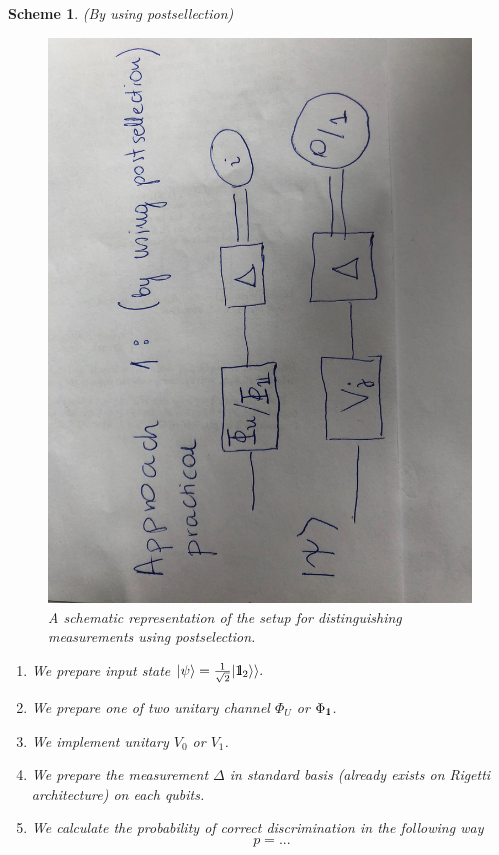 \documentclass[11pt,a4paper,reqno, oneside]{amsart}
\newcommand{\ket}[1]{\ensuremath{|#1\rangle}}
\newcommand{\1}{{\rm 1\hspace{-0.9mm}l}}
\newcommand{\Id}{{\rm 1\hspace{-0.9mm}l}}
\newtheorem{scheme}{Scheme}
\begin{document}
\newpage
\begin{scheme}(By using postsellection)

\begin{figure}[h!]
	\centering 
	\includegraphics[width=0.75\linewidth, angle=-90]{rys-postsellection.jpg} 
	
	\caption{ A schematic representation of the setup for distinguishing
		measurements using postselection. 
	}\label{fig:postsellection}
\end{figure}
\begin{enumerate}
\item We prepare input state $\ket{\psi} = \frac{1}{\sqrt{2} } | \Id_2 \rangle 
\rangle. $
\item We prepare one of two unitary channel $\Phi_{U} $ or $\Phi_{\1}$. 
\item We implement unitary $V_0 $ or $ V_1$.
\item We prepare the measurement $\Delta$ in standard basis (already exists on 
Rigetti architecture) on each qubits.
\item We calculate the probability of correct discrimination in the following 
way
\begin{equation}
p = ...
\end{equation}
\end{enumerate}
\end{scheme}
\end{document}
